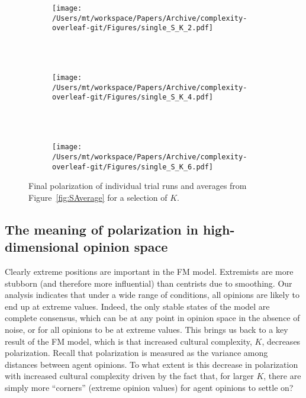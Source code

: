 \begin{figure}[H]
  \centering
  \begin{subfigure}[t]{\textwidth}
    \centering
    \texttt{[image: /Users/mt/workspace/Papers/Archive/complexity-overleaf-git/Figures/single\_S\_K\_2.pdf]}
  \end{subfigure} \\
  ~
  \begin{subfigure}[t]{0.49\textwidth}
      \centering
      \texttt{[image: /Users/mt/workspace/Papers/Archive/complexity-overleaf-git/Figures/single\_S\_K\_4.pdf]}
  \end{subfigure} \\
  ~
  \begin{subfigure}[t]{0.49\textwidth}
      \centering
      \texttt{[image: /Users/mt/workspace/Papers/Archive/complexity-overleaf-git/Figures/single\_S\_K\_6.pdf]}
  \end{subfigure}
  \caption{Final polarization of individual trial runs and averages from
    Figure~\ref{fig:SAverage} for a selection of $K$. 
  }
  \label{fig:singleSK}
\end{figure}



\subsection{The meaning of polarization in high-dimensional opinion space}
Clearly extreme positions are important in the FM model. Extremists are
more stubborn (and therefore more influential) than centrists due to smoothing. Our analysis indicates that under a wide range of conditions, all opinions are likely to end up at extreme values. Indeed, the only stable states of the model are complete consensus, which can be at any point in opinion space in the absence of noise, or for all opinions to be at extreme values. This brings us back to a key result of the FM model, which is that increased cultural complexity, $K$, decreases polarization. Recall that polarization is measured as the variance among distances between agent opinions. To what extent is this decrease in polarization with increased cultural complexity driven by the fact that, for larger $K$, there are simply more ``corners'' (extreme opinion values) for agent opinions to settle on? 

